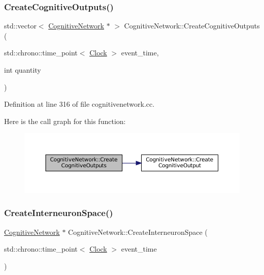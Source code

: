 \subsubsection{\texorpdfstring{Create\+Cognitive\+Outputs()}{CreateCognitiveOutputs()}}
{\footnotesize\ttfamily std\+::vector$<$ \mbox{\hyperlink{class_cognitive_network}{Cognitive\+Network}} $\ast$ $>$ Cognitive\+Network\+::\+Create\+Cognitive\+Outputs (\begin{DoxyParamCaption}\item[{std\+::chrono\+::time\+\_\+point$<$ \mbox{\hyperlink{universe_8h_a0ef8d951d1ca5ab3cfaf7ab4c7a6fd80}{Clock}} $>$}]{event\+\_\+time,  }\item[{int}]{quantity }\end{DoxyParamCaption})}



Definition at line 316 of file cognitivenetwork.\+cc.

Here is the call graph for this function\+:\nopagebreak
\begin{figure}[H]
\begin{center}
\leavevmode
\includegraphics[width=350pt]{class_cognitive_network_a002df11f4389a122fc140c186ab665c9_cgraph}
\end{center}
\end{figure}
\mbox{\label{class_cognitive_network_af0dc86c7905baae6f2b5efb3a65b8819}} 
\subsubsection{\texorpdfstring{Create\+Interneuron\+Space()}{CreateInterneuronSpace()}}
{\footnotesize\ttfamily \mbox{\hyperlink{class_cognitive_network}{Cognitive\+Network}} $\ast$ Cognitive\+Network\+::\+Create\+Interneuron\+Space (\begin{DoxyParamCaption}\item[{std\+::chrono\+::time\+\_\+point$<$ \mbox{\hyperlink{universe_8h_a0ef8d951d1ca5ab3cfaf7ab4c7a6fd80}{Clock}} $>$}]{event\+\_\+time }\end{DoxyParamCaption})}



